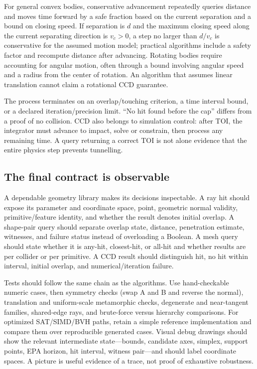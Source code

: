 For general convex bodies, conservative advancement repeatedly queries distance and moves time forward by a safe fraction based on the current separation and a bound on closing speed. If separation is \(d\) and the maximum closing speed along the current separating direction is \(v_c>0\), a step no larger than \(d/v_c\) is conservative for the assumed motion model; practical algorithms include a safety factor and recompute distance after advancing. Rotating bodies require accounting for angular motion, often through a bound involving angular speed and a radius from the center of rotation. An algorithm that assumes linear translation cannot claim a rotational CCD guarantee.

The process terminates on an overlap/touching criterion, a time interval bound, or a declared iteration/precision limit. ``No hit found before the cap'' differs from a proof of no collision. CCD also belongs to simulation control: after TOI, the integrator must advance to impact, solve or constrain, then process any remaining time. A query returning a correct TOI is not alone evidence that the entire physics step prevents tunnelling.

\subsection{The final contract is observable}\label{03-visual-computing-i-ch020-the-final-contract-is-observable}

A dependable geometry library makes its decisions inspectable. A ray hit should expose its parameter and coordinate space, point, geometric normal validity, primitive/feature identity, and whether the result denotes initial overlap. A shape-pair query should separate overlap state, distance, penetration estimate, witnesses, and failure status instead of overloading a Boolean. A mesh query should state whether it is any-hit, closest-hit, or all-hit and whether results are per collider or per primitive. A CCD result should distinguish hit, no hit within interval, initial overlap, and numerical/iteration failure.

Tests should follow the same chain as the algorithms. Use hand-checkable numeric cases, then symmetry checks (swap A and B and reverse the normal), translation and uniform-scale metamorphic checks, degenerate and near-tangent families, shared-edge rays, and brute-force versus hierarchy comparisons. For optimized SAT/SIMD/BVH paths, retain a simple reference implementation and compare them over reproducible generated cases. Visual debug drawings should show the relevant intermediate state---bounds, candidate axes, simplex, support points, EPA horizon, hit interval, witness pair---and should label coordinate spaces. A picture is useful evidence of a trace, not proof of exhaustive robustness.

